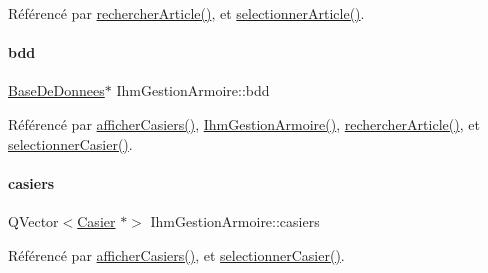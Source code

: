 Référencé par \hyperlink{class_ihm_gestion_armoire_a594f25b58b70700e19e3e7f567325c40}{rechercher\+Article()}, et \hyperlink{class_ihm_gestion_armoire_a28970b692994ad7201c03decd42ec0e5}{selectionner\+Article()}.

\mbox{\label{class_ihm_gestion_armoire_ad0d3a89bbcfa9f0e50ff5c50ec64d707}} 
\paragraph{\texorpdfstring{bdd}{bdd}}
{\footnotesize\ttfamily \hyperlink{class_base_de_donnees}{Base\+De\+Donnees}$\ast$ Ihm\+Gestion\+Armoire\+::bdd\hspace{0.3cm}{\ttfamily [private]}}



Référencé par \hyperlink{class_ihm_gestion_armoire_a04201173bd9ac135227ac56a6c22a999}{afficher\+Casiers()}, \hyperlink{class_ihm_gestion_armoire_a7aa5e1514dd5d1b5648a2f6dd36970f9}{Ihm\+Gestion\+Armoire()}, \hyperlink{class_ihm_gestion_armoire_a594f25b58b70700e19e3e7f567325c40}{rechercher\+Article()}, et \hyperlink{class_ihm_gestion_armoire_ac2e2365408fcbf66c0e75bb828b40162}{selectionner\+Casier()}.

\mbox{\label{class_ihm_gestion_armoire_acd01a783a46b27a1b8d1535f5ce16212}} 
\paragraph{\texorpdfstring{casiers}{casiers}}
{\footnotesize\ttfamily Q\+Vector$<$\hyperlink{class_casier}{Casier} $\ast$$>$ Ihm\+Gestion\+Armoire\+::casiers\hspace{0.3cm}{\ttfamily [private]}}



Référencé par \hyperlink{class_ihm_gestion_armoire_a04201173bd9ac135227ac56a6c22a999}{afficher\+Casiers()}, et \hyperlink{class_ihm_gestion_armoire_ac2e2365408fcbf66c0e75bb828b40162}{selectionner\+Casier()}.

\mbox{\label{class_ihm_gestion_armoire_a3186adbd003db3309c640ac414d39d2e}} 
